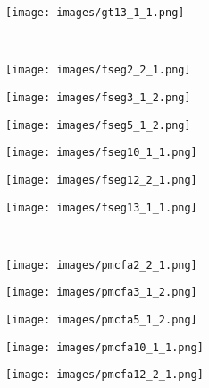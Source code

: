 \documentclass[journal]{IEEEtran}
\begin{document}
\begin{figure*}
\begin{subfigure}[b]{0.16\textwidth}
        \texttt{[image: images/gt13\_1\_1.png]}
    \end{subfigure}
    \\
    \vspace{1mm}
    \begin{subfigure}[b]{0.16\textwidth}
        \texttt{[image: images/fseg2\_2\_1.png]}
    \end{subfigure}
    \hfill
    \begin{subfigure}[b]{0.16\textwidth}
        \texttt{[image: images/fseg3\_1\_2.png]}
    \end{subfigure}
    \hfill
    \begin{subfigure}[b]{0.16\textwidth}
        \texttt{[image: images/fseg5\_1\_2.png]}
    \end{subfigure}
    \hfill
    \begin{subfigure}[b]{0.16\textwidth}
        \texttt{[image: images/fseg10\_1\_1.png]}
    \end{subfigure}
    \hfill
    \begin{subfigure}[b]{0.16\textwidth}
        \texttt{[image: images/fseg12\_2\_1.png]}
    \end{subfigure}
    \hfill
    \begin{subfigure}[b]{0.16\textwidth}
        \texttt{[image: images/fseg13\_1\_1.png]}
    \end{subfigure}
    \\
    \vspace{1mm}
    \begin{subfigure}[b]{0.16\textwidth}
        \texttt{[image: images/pmcfa2\_2\_1.png]}
    \end{subfigure}
    \hfill
    \begin{subfigure}[b]{0.16\textwidth}
        \texttt{[image: images/pmcfa3\_1\_2.png]}
    \end{subfigure}
    \hfill
    \begin{subfigure}[b]{0.16\textwidth}
        \texttt{[image: images/pmcfa5\_1\_2.png]}
    \end{subfigure}
    \hfill
    \begin{subfigure}[b]{0.16\textwidth}
        \texttt{[image: images/pmcfa10\_1\_1.png]}
    \end{subfigure}
    \hfill
    \begin{subfigure}[b]{0.16\textwidth}
        \texttt{[image: images/pmcfa12\_2\_1.png]}

\end{subfigure}
\end{figure*}
\end{document}
